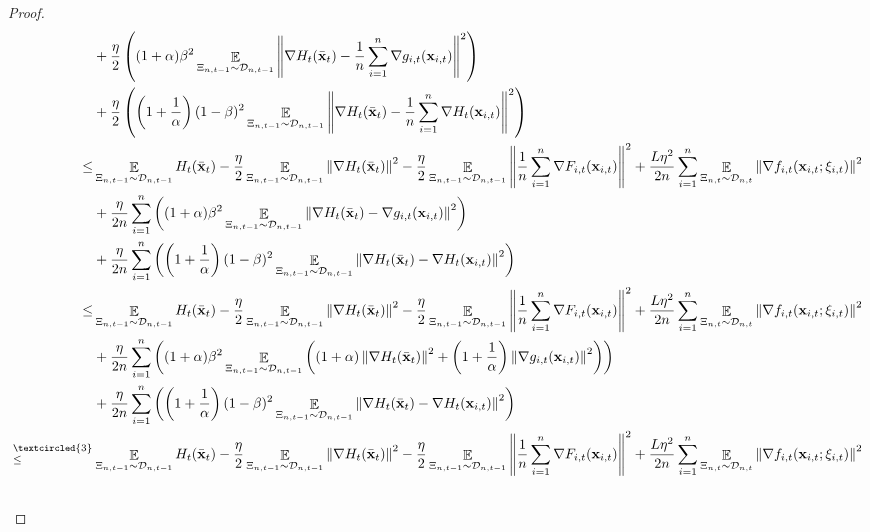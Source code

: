 \documentclass{article}
\begin{document}
\begin{proof}
\begin{align}
& + \frac{\eta}{2}\lrincir{(1+\alpha)\beta^2\EE_{ \Xi_{n,t-1} \sim \Dcal_{n,t-1} }\lrnorm{\nabla H_t(\bar{\x}_t) -\frac{1}{n}\sum_{i=1}^n \nabla g_{i,t}(\x_{i,t})}^2 } \\ \nonumber 
& + \frac{\eta}{2}\lrincir{\lrincir{1+\frac{1}{\alpha}}(1-\beta)^2\EE_{ \Xi_{n,t-1} \sim \Dcal_{n,t-1} }\lrnorm{\nabla H_t(\bar{\x}_t) -\frac{1}{n}\sum_{i=1}^n \nabla H_t(\x_{i,t})}^2  }  \\ \nonumber
\le & \EE_{ \Xi_{n,t-1} \sim \Dcal_{n,t-1} } H_t(\bar{\x}_t) - \frac{\eta}{2}\EE_{ \Xi_{n,t-1} \sim \Dcal_{n,t-1} }\lrnorm{\nabla H_t(\bar{\x}_t)}^2 - \frac{\eta}{2}\EE_{ \Xi_{n,t-1} \sim \Dcal_{n,t-1} }\lrnorm{\frac{1}{n}\sum_{i=1}^n \nabla F_{i,t}(\x_{i,t})}^2  + \frac{L\eta^2}{2n}\sum_{i=1}^n\EE_{ \Xi_{n,t} \sim \Dcal_{n,t} }\lrnorm{ \nabla f_{i,t}(\x_{i,t};\xi_{i,t})}^2 \\ \nonumber
& + \frac{\eta}{2n}\sum_{i=1}^n\lrincir{(1+\alpha)\beta^2\EE_{ \Xi_{n,t-1} \sim \Dcal_{n,t-1} }\lrnorm{\nabla H_t(\bar{\x}_t) - \nabla g_{i,t}(\x_{i,t})}^2 } \\ \nonumber 
& + \frac{\eta}{2n}\sum_{i=1}^n\lrincir{ \lrincir{1+\frac{1}{\alpha}} (1-\beta)^2\EE_{ \Xi_{n,t-1} \sim \Dcal_{n,t-1} }\lrnorm{\nabla H_t(\bar{\x}_t) - \nabla H_t(\x_{i,t})}^2  }  \\ \nonumber
\le & \EE_{ \Xi_{n,t-1} \sim \Dcal_{n,t-1} } H_t(\bar{\x}_t) - \frac{\eta}{2}\EE_{ \Xi_{n,t-1} \sim \Dcal_{n,t-1} }\lrnorm{\nabla H_t(\bar{\x}_t)}^2 - \frac{\eta}{2}\EE_{ \Xi_{n,t-1} \sim \Dcal_{n,t-1} }\lrnorm{\frac{1}{n}\sum_{i=1}^n \nabla F_{i,t}(\x_{i,t})}^2  + \frac{L\eta^2}{2n}\sum_{i=1}^n\EE_{ \Xi_{n,t} \sim \Dcal_{n,t} }\lrnorm{ \nabla f_{i,t}(\x_{i,t};\xi_{i,t})}^2 \\ \nonumber
& + \frac{\eta}{2n}\sum_{i=1}^n\lrincir{(1+\alpha)\beta^2\EE_{ \Xi_{n,t-1} \sim \Dcal_{n,t-1} }\lrincir{ (1+\alpha)  \lrnorm{\nabla H_t(\bar{\x}_t) }^2 +  \lrincir{1+\frac{1}{\alpha}}   \lrnorm{\nabla g_{i,t}(\x_{i,t})}^2 } } \\ \nonumber 
& + \frac{\eta}{2n}\sum_{i=1}^n\lrincir{ \lrincir{1+\frac{1}{\alpha}}(1-\beta)^2\EE_{ \Xi_{n,t-1} \sim \Dcal_{n,t-1} }\lrnorm{\nabla H_t(\bar{\x}_t) - \nabla H_t(\x_{i,t})}^2  }  \\ \nonumber
\refabovecir{\le}{\textcircled{3}} & \EE_{ \Xi_{n,t-1} \sim \Dcal_{n,t-1} } H_t(\bar{\x}_t) - \frac{\eta}{2}\EE_{ \Xi_{n,t-1} \sim \Dcal_{n,t-1} }\lrnorm{\nabla H_t(\bar{\x}_t)}^2 - \frac{\eta}{2}\EE_{ \Xi_{n,t-1} \sim \Dcal_{n,t-1} }\lrnorm{\frac{1}{n}\sum_{i=1}^n \nabla F_{i,t}(\x_{i,t})}^2  + \frac{L\eta^2}{2n}\sum_{i=1}^n\EE_{ \Xi_{n,t} \sim \Dcal_{n,t} }\lrnorm{ \nabla f_{i,t}(\x_{i,t};\xi_{i,t})}^2 \\ \nonumber

\end{align}
\end{proof}
\end{document}
